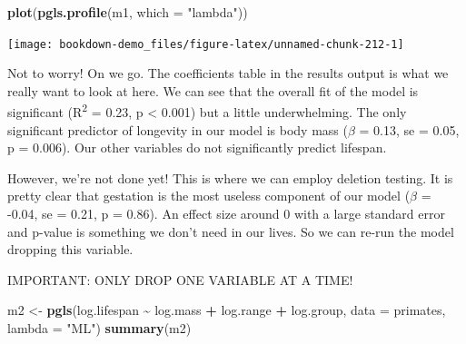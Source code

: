 \documentclass[
]{book}
\newenvironment{Shaded}{\begin{snugshade}}{\end{snugshade}}
\newcommand{\DataTypeTok}[1]{\textcolor[rgb]{0.13,0.29,0.53}{#1}}
\newcommand{\KeywordTok}[1]{\textcolor[rgb]{0.13,0.29,0.53}{\textbf{#1}}}
\newcommand{\NormalTok}[1]{#1}
\newcommand{\OperatorTok}[1]{\textcolor[rgb]{0.81,0.36,0.00}{\textbf{#1}}}
\newcommand{\StringTok}[1]{\textcolor[rgb]{0.31,0.60,0.02}{#1}}
\begin{document}
\begin{Shaded}
\begin{Highlighting}[]
\KeywordTok{plot}\NormalTok{(}\KeywordTok{pgls.profile}\NormalTok{(m1, }\DataTypeTok{which =} \StringTok{"lambda"}\NormalTok{))}
\end{Highlighting}
\end{Shaded}

\begin{center}\texttt{[image: bookdown-demo\_files/figure-latex/unnamed-chunk-212-1]} \end{center}

Not to worry! On we go. The coefficients table in the results output is what we really want to look at here. We can see that the overall fit of the model is significant (R\textsuperscript{2} = 0.23, p \textless{} 0.001) but a little underwhelming. The only significant predictor of longevity in our model is body mass (\(\beta\) = 0.13, se = 0.05, p = 0.006). Our other variables do not significantly predict lifespan.

However, we're not done yet! This is where we can employ deletion testing. It is pretty clear that gestation is the most useless component of our model (\(\beta\) = -0.04, se = 0.21, p = 0.86). An effect size around 0 with a large standard error and p-value is something we don't need in our lives. So we can re-run the model dropping this variable.

IMPORTANT: ONLY DROP ONE VARIABLE AT A TIME!

\begin{Shaded}
\begin{Highlighting}[]
\NormalTok{m2 \textless{}{-}}\StringTok{ }\KeywordTok{pgls}\NormalTok{(log.lifespan }\OperatorTok{\textasciitilde{}}\StringTok{ }\NormalTok{log.mass }\OperatorTok{+}\StringTok{ }\NormalTok{log.range }\OperatorTok{+}\StringTok{ }\NormalTok{log.group,}
           \DataTypeTok{data =}\NormalTok{ primates, }\DataTypeTok{lambda =} \StringTok{"ML"}\NormalTok{)}
\KeywordTok{summary}\NormalTok{(m2)}
\end{Highlighting}
\end{Shaded}
\end{document}
